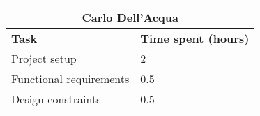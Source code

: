 \begin{table}[h]
  \center
  \begin{tabular}{l|l}
    \multicolumn{2}{c}{\textbf{Carlo Dell'Acqua}} \\
    \hline
    \textbf{Task} & \textbf{Time spent (hours)}\\
    \hline
    Project setup & 2 \\
    Functional requirements & 0.5 \\
    Design constraints & 0.5 \\
  \end{tabular}
\end{table}